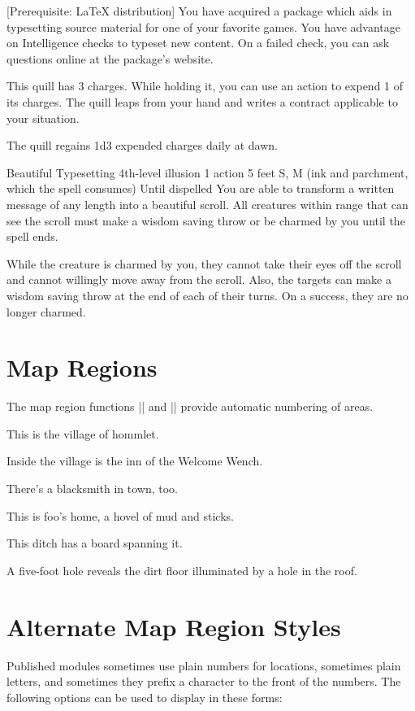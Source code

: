 \documentclass[letterpaper,twocolumn,openany]{dndarticle}
\begin{document}
[Prerequisite: \LaTeX{} distribution]
You have acquired a package which aids in typesetting source material for one of your favorite games. You have advantage on Intelligence checks to typeset new content. On a failed check, you can ask questions online at the package's website.

This quill has 3 charges. While holding it, you can use an action to expend 1 of its charges. The quill leaps from your hand and writes a contract applicable to your situation.

The quill regains 1d3 expended charges daily at dawn.

\DndSpellHeader%
  {Beautiful Typesetting}
  {4th-level illusion}
  {1 action}
  {5 feet}
  {S, M (ink and parchment, which the spell consumes)}
  {Until dispelled}
You are able to transform a written message of any length into a beautiful scroll. All creatures within range that can see the scroll must make a wisdom saving throw or be charmed by you until the spell ends.

While the creature is charmed by you, they cannot take their eyes off the scroll and cannot willingly move away from the scroll. Also, the targets can make a wisdom saving throw at the end of each of their turns. On a success, they are no longer charmed.

\section{Map Regions}
The map region functions |\area| and |\subarea| provide automatic numbering of areas.

This is the village of hommlet.

Inside the village is the inn of the Welcome Wench.

There's a blacksmith in town, too.

This is foo's home, a hovel of mud and sticks.

This ditch has a board spanning it.

A five-foot hole reveals the dirt floor illuminated by a hole in the roof.

\section{Alternate Map Region Styles}
Published modules sometimes use plain numbers for locations, sometimes plain
letters, and sometimes they prefix a character to the front of the numbers.
The following options can be used to display in these forms:
\end{document}
